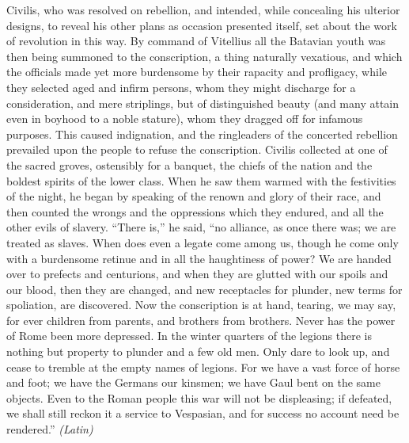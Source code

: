 
Civilis, who was resolved on rebellion, and intended, while concealing his ulterior designs, to reveal his other plans as occasion presented itself, set about the work of revolution in this way. By command of Vitellius all the Batavian youth was then being summoned to the conscription, a thing naturally vexatious, and which the officials made yet more burdensome by their rapacity and profligacy, while they selected aged and infirm persons, whom they might discharge for a consideration, and mere striplings, but of distinguished beauty (and many attain even in boyhood to a noble stature), whom they dragged off for infamous purposes. This caused indignation, and the ringleaders of the concerted rebellion prevailed upon the people to refuse the conscription. Civilis collected at one of the sacred groves, ostensibly for a banquet, the chiefs of the nation and the boldest spirits of the lower class. When he saw them warmed with the festivities of the night, he began by speaking of the renown and glory of their race, and then counted the wrongs and the oppressions which they endured, and all the other evils of slavery. ``There is,'' he said, ``no alliance, as once there was; we are treated as slaves. When does even a legate come among us, though he come only with a burdensome retinue and in all the haughtiness of power? We are handed over to prefects and centurions, and when they are glutted with our spoils and our blood, then they are changed, and new receptacles for plunder, new terms for spoliation, are discovered. Now the conscription is at hand, tearing, we may say, for ever children from parents, and brothers from brothers. Never has the power of Rome been more depressed. In the winter quarters of the legions there is nothing but property to plunder and a few old men. Only dare to look up, and cease to tremble at the empty names of legions. For we have a vast force of horse and foot; we have the Germans our kinsmen; we have Gaul bent on the same objects. Even to the Roman people this war will not be displeasing; if defeated, we shall still reckon it a service to Vespasian, and for success no account need be rendered.'' \emph{(Latin)}


